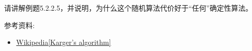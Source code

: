 \documentclass[a4paper, justified]{tufte-handout}
\begin{document}
\beginoptional


\beginot
\begin{ot}[例题5.2.2.5]
  请讲解例题5.2.2.5，并说明，为什么这个随机算法代价好于“任何”确定性算法。
\end{ot}





\vspace{0.50cm}
\begin{ot}

  \noindent 参考资料:
  \begin{itemize}
    \item \href{https://en.wikipedia.org/wiki/Karger%27s_algorithm}{ Wikipedia[Karger's algorithm]}
  \end{itemize}
\end{ot}




\beginfb

% 
% 
\end{document}
